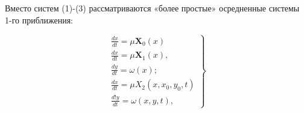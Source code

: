 \documentclass[10pt]{article}
\begin{document}
Вместо систем (1)-(3) рассматриваются «более простые» осредненные системы 1-го приближения:

\[
\left.\begin{array}{c}
\frac{d x}{d t}=\mu \boldsymbol{X}_{0}(x) \\
\frac{d x}{d t}=\mu \boldsymbol{X}_{1}(x), \quad \\
\frac{d y}{d t}=\omega(x) ; \\
\frac{d x}{d t}=\mu X_{2}\left(x, x_{0}, y_{0}, t\right) \\
\frac{d ! y}{d t}=\omega(x, y, t),
\end{array}\right\}
\]
\end{document}
